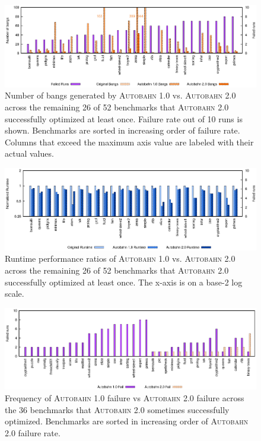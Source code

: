 \documentclass[format=sigplan, review=true, 9pt]{acmart}
\newcommand{\scaption}[1]{\caption{#1}}
\newcommand{\Ao}[0]{\textsc{Autobahn 1.0}}
\newcommand{\At}[0]{\textsc{Autobahn 2.0}}
\begin{document}
\begin{figure}
\includegraphics[width=\textwidth]{pap1-bangs}
\scaption{Number of bangs generated by \Ao{} vs. \At{} across the
remaining 26 of 52 benchmarks that \At{} successfully optimized at least
once. Failure rate out of 10 runs is shown. Benchmarks are sorted in
increasing order of failure rate. Columns that exceed the maximum axis
value are labeled with their actual values. } 
\label{fig:2-bangs-52}
\end{figure}

\begin{figure}
\includegraphics[width=\textwidth]{pap1}
\scaption{Runtime performance ratios of \Ao{} vs. \At{} across the
remaining 26 of 52 benchmarks that \At{} successfully optimized at least
once. The x-axis is on a base-2 log scale.
}
\label{fig:2-ratio-52}
\end{figure}

\begin{figure}
\includegraphics[width=\textwidth]{pap-fail}
\scaption{Frequency of \Ao{} failure vs \At{} failure across the 36
benchmarks that \At{} sometimes successfully optimized. Benchmarks are sorted in
increasing order of \At{} failure rate. } 
\label{fig:2-failures}
\end{figure}
\end{document}
